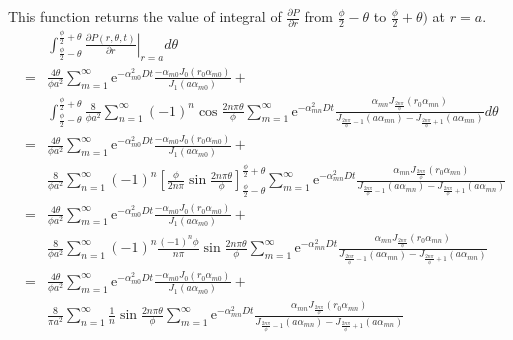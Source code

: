 \documentclass{article}
\begin{document}
This function returns the value of integral of $\frac{\partial P}{\partial r}$
from $\frac{\phi}{2} - \theta$ to $\frac{\phi}{2} + \theta)$ at $r = a$.
\begin{eqnarray}
    & & \int^{\frac{\phi}{2} + \theta}_{\frac{\phi}{2} - \theta}
        \left.\frac{\partial P(r, \theta, t)}{\partial r}\right|_{r = a}d\theta
        \nonumber\\
    &=& \frac{4\theta}{\phi a^2} \sum^{\infty}_{m=1}
        \mathrm{e}^{-\alpha_{m0}^2Dt}
        \frac{-\alpha_{m0}J_0(r_0\alpha_{m0})}{J_1(a\alpha_{m0})} +\nonumber\\
    & & \int^{\frac{\phi}{2} + \theta}_{\frac{\phi}{2} - \theta}
        \frac{8}{\phi a^2}\sum^{\infty}_{n=1}
        (-1)^n\cos\frac{2n\pi\theta}{\phi}
        \sum^{\infty}_{m=1}
        \mathrm{e}^{-\alpha_{mn}^2Dt}
        \frac{\alpha_{mn}J_{\frac{2n\pi}{\phi}}(r_0\alpha_{mn})}
             {J_{\frac{2n\pi}{\phi} - 1}(a\alpha_{mn}) -
              J_{\frac{2n\pi}{\phi} + 1}(a\alpha_{mn})}
        d\theta\nonumber\\
    &=& \frac{4\theta}{\phi a^2} \sum^{\infty}_{m=1}
        \mathrm{e}^{-\alpha_{m0}^2Dt}
        \frac{-\alpha_{m0}J_0(r_0\alpha_{m0})}{J_1(a\alpha_{m0})} +\nonumber\\
    & & \frac{8}{\phi a^2}\sum^{\infty}_{n=1}
        (-1)^n
        \left[\frac{\phi}{2n\pi}\sin\frac{2n\pi\theta}{\phi}
        \right]^{\frac{\phi}{2} + \theta}_{\frac{\phi}{2} - \theta}
        \sum^{\infty}_{m=1}
        \mathrm{e}^{-\alpha_{mn}^2Dt}
        \frac{\alpha_{mn}J_{\frac{2n\pi}{\phi}}(r_0\alpha_{mn})}
             {J_{\frac{2n\pi}{\phi} - 1}(a\alpha_{mn}) -
              J_{\frac{2n\pi}{\phi} + 1}(a\alpha_{mn})}
        \nonumber\\
    &=& \frac{4\theta}{\phi a^2} \sum^{\infty}_{m=1}
        \mathrm{e}^{-\alpha_{m0}^2Dt}
        \frac{-\alpha_{m0}J_0(r_0\alpha_{m0})}{J_1(a\alpha_{m0})} +\nonumber\\
    & & \frac{8}{\phi a^2}\sum^{\infty}_{n=1}(-1)^n
        \frac{(-1)^n\phi}{n\pi}\sin\frac{2n\pi\theta}{\phi}
        \sum^{\infty}_{m=1}\mathrm{e}^{-\alpha_{mn}^2Dt}
        \frac{\alpha_{mn}J_{\frac{2n\pi}{\phi}}(r_0\alpha_{mn})}
             {J_{\frac{2n\pi}{\phi} - 1}(a\alpha_{mn}) -
              J_{\frac{2n\pi}{\phi} + 1}(a\alpha_{mn})}
        \nonumber\\
    &=& \frac{4\theta}{\phi a^2} \sum^{\infty}_{m=1}
        \mathrm{e}^{-\alpha_{m0}^2Dt}
        \frac{-\alpha_{m0}J_0(r_0\alpha_{m0})}{J_1(a\alpha_{m0})} +\nonumber\\
    & & \frac{8}{\pi a^2}\sum^{\infty}_{n=1}
        \frac{1}{n}\sin\frac{2n\pi\theta}{\phi}
        \sum^{\infty}_{m=1}\mathrm{e}^{-\alpha_{mn}^2Dt}
        \frac{\alpha_{mn}J_{\frac{2n\pi}{\phi}}(r_0\alpha_{mn})}
             {J_{\frac{2n\pi}{\phi} - 1}(a\alpha_{mn}) -
              J_{\frac{2n\pi}{\phi} + 1}(a\alpha_{mn})}
        \nonumber\\
\end{eqnarray}
\end{document}
